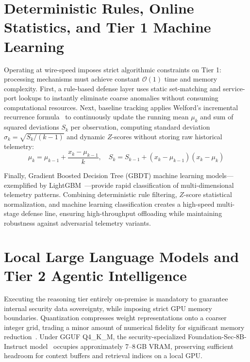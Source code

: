 \section{Deterministic Rules, Online Statistics, and Tier 1 Machine Learning}
\label{sec:welford}

Operating at wire-speed imposes strict algorithmic constraints on Tier 1: processing mechanisms must achieve constant $\mathcal{O}(1)$ time and memory complexity. First, a rule-based defense layer uses static set-matching and service-port lookups to instantly eliminate coarse anomalies without consuming computational resources. Next, baseline tracking applies Welford's incremental recurrence formula~\cite{welford1962} to continuously update the running mean $\mu_k$ and sum of squared deviations $S_k$ per observation, computing standard deviation $\sigma_k = \sqrt{S_k / (k-1)}$ and dynamic $Z$-scores without storing raw historical telemetry:
\begin{equation}
\label{eq:welford}
    \mu_k = \mu_{k-1} + \frac{x_k - \mu_{k-1}}{k}, \quad S_k = S_{k-1} + (x_k - \mu_{k-1})(x_k - \mu_k)
\end{equation}

Finally, Gradient Boosted Decision Tree (GBDT) machine learning models---exemplified by LightGBM~\cite{ke2017lightgbm}---provide rapid classification of multi-dimensional telemetry patterns. Combining deterministic rule filtering, $Z$-score statistical normalization, and machine learning classification creates a high-speed multi-stage defense line, ensuring high-throughput offloading while maintaining robustness against adversarial telemetry variants.

\section{Local Large Language Models and Tier 2 Agentic Intelligence}
\label{sec:local_llm}

Executing the reasoning tier entirely on-premise is mandatory to guarantee internal security data sovereignty, while imposing strict GPU memory boundaries. Quantization compresses weight representations onto a coarser integer grid, trading a minor amount of numerical fidelity for significant memory reduction~\cite{quantization2021}. Under GGUF Q4\_K\_M, the security-specialized Foundation-Sec-8B-Instruct model~\cite{foundation_sec_instruct, foundation_sec_2024} occupies approximately 7–8\,GB VRAM, preserving sufficient headroom for context buffers and retrieval indices on a local GPU.

